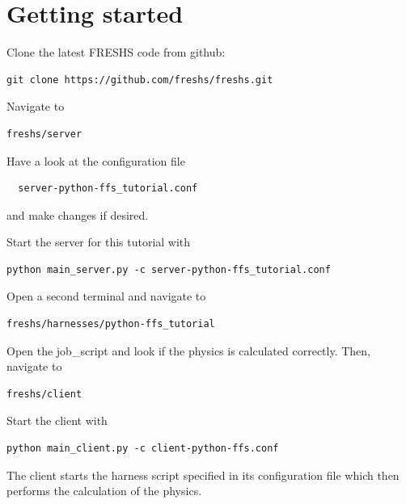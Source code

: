 \documentclass[a4paper,oneside]{article}
\newenvironment{mylisting}
{\begin{list}{}{\setlength{\leftmargin}{1em}}\item\scriptsize\bfseries}
{\end{list}}
\begin{document}
\section{Getting started}

\begin{enumerate}
 \item Clone the latest FRESHS code from github:
\begin{mylisting}
\begin{verbatim}
git clone https://github.com/freshs/freshs.git
\end{verbatim}
\end{mylisting}
 \item Navigate to 
\begin{mylisting}
\begin{verbatim}
freshs/server
 \end{verbatim}
\end{mylisting}
 \item Have a look at the configuration file
\begin{mylisting}
 \begin{verbatim}
  server-python-ffs_tutorial.conf
 \end{verbatim}
\end{mylisting}
 and make changes if desired.
 \item Start the server for this tutorial with
\begin{mylisting}
\begin{verbatim}
python main_server.py -c server-python-ffs_tutorial.conf
\end{verbatim}
\end{mylisting}
 \item Open a second terminal and navigate to
\begin{mylisting}
\begin{verbatim}
freshs/harnesses/python-ffs_tutorial
\end{verbatim}
\end{mylisting}
Open the job\_script and look if the physics is calculated correctly. Then, navigate to
\begin{mylisting}
\begin{verbatim}
freshs/client
\end{verbatim}
\end{mylisting}
 \item Start the client with
\begin{mylisting}
\begin{verbatim}
python main_client.py -c client-python-ffs.conf
\end{verbatim}
\end{mylisting}
\end{enumerate}
The client starts the harness script specified in its configuration file which then performs the calculation of the physics.
\end{document}
